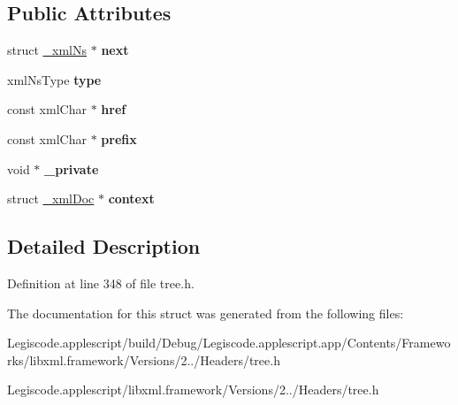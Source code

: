 \subsection*{Public Attributes}
\begin{DoxyCompactItemize}
\item 
\hypertarget{struct__xml_ns_a6f57f2718d7696076f46cec563a1f344}{struct \hyperlink{struct__xml_ns}{\-\_\-xml\-Ns} $\ast$ {\bfseries next}}\label{struct__xml_ns_a6f57f2718d7696076f46cec563a1f344}

\item 
\hypertarget{struct__xml_ns_a84c713211df0640c7cfb1e7c64149214}{xml\-Ns\-Type {\bfseries type}}\label{struct__xml_ns_a84c713211df0640c7cfb1e7c64149214}

\item 
\hypertarget{struct__xml_ns_ad9dd47dd11698ed47cc62a4c25406868}{const xml\-Char $\ast$ {\bfseries href}}\label{struct__xml_ns_ad9dd47dd11698ed47cc62a4c25406868}

\item 
\hypertarget{struct__xml_ns_a26e92982bad5ce5b1c039208bdd281d5}{const xml\-Char $\ast$ {\bfseries prefix}}\label{struct__xml_ns_a26e92982bad5ce5b1c039208bdd281d5}

\item 
\hypertarget{struct__xml_ns_ac251ddaecf66b4bc98ba61f3369e9173}{void $\ast$ {\bfseries \-\_\-private}}\label{struct__xml_ns_ac251ddaecf66b4bc98ba61f3369e9173}

\item 
\hypertarget{struct__xml_ns_ae159f51d12eef9f56610735b5b509fcc}{struct \hyperlink{struct__xml_doc}{\-\_\-xml\-Doc} $\ast$ {\bfseries context}}\label{struct__xml_ns_ae159f51d12eef9f56610735b5b509fcc}

\end{DoxyCompactItemize}


\subsection{Detailed Description}


Definition at line 348 of file tree.\-h.



The documentation for this struct was generated from the following files\-:\begin{DoxyCompactItemize}
\item 
Legiscode.\-applescript/build/\-Debug/\-Legiscode.\-applescript.\-app/\-Contents/\-Frameworks/libxml.\-framework/\-Versions/2../\-Headers/tree.\-h\item 
Legiscode.\-applescript/libxml.\-framework/\-Versions/2../\-Headers/tree.\-h\end{DoxyCompactItemize}
